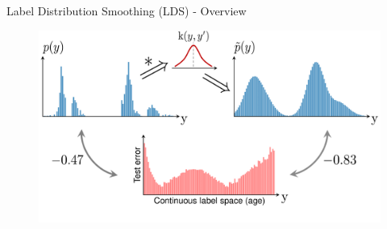 \begin{frame}{Label Distribution Smoothing (LDS) - Overview}
	\begin{figure}[h]
		\includegraphics[width=\linewidth]{images/err_motivate_sep.pdf}
	\end{figure}
\end{frame}


